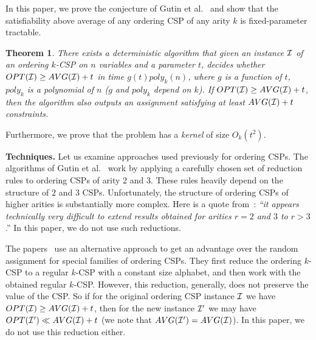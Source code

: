 \documentclass[11pt]{article}
\newcommand {\calI}    {{\cal I}}
\newtheorem{theorem}{Theorem}
\begin{document}
In this paper, we prove the conjecture of Gutin et al.~\cite{GIMY} and show that the satisfiability above average of any ordering CSP of any arity $k$ is fixed-parameter tractable.
\begin{theorem}\label{thm:main-intro}
There exists a deterministic algorithm that given an instance $\calI$ of an ordering $k$-CSP on $n$ variables and a parameter $t$, decides whether
$OPT(\calI) \geq AVG(\calI) + t$ in time $g(t)poly_k(n)$, where $g$ is a function of $t$, $poly_k$ is a polynomial of $n$ ($g$ and $poly_k$ depend on $k$).
If $OPT(\calI) \geq AVG(\calI) + t$, then the algorithm also outputs an assignment satisfying at least $AVG(\calI) + t$ constraints.
\end{theorem}
Furthermore, we prove that the problem has a \emph{kernel} of size $O_k(t^2)$.


\medskip

\noindent \textbf{Techniques.} Let us examine approaches used previously for ordering CSPs.
The algorithms of Gutin et al.~\cite{GKSY, GIMY, GKMY} work by applying a carefully chosen
set of reduction rules to ordering CSPs of arity 2 and 3. These rules heavily depend on the structure of
$2$ and $3$ CSPs. Unfortunately, the structure of ordering
CSPs of higher arities is substantially more complex. Here is a quote from~\cite{GIMY}: \emph{``it appears technically
very difficult to extend results obtained for arities $r = 2$ and $3$ to $r > 3$}.''
In this paper, we do not use such reductions.

The papers~\cite{CMM, GZ, Mak} use an alternative approach to get an advantage over the random assignment
for special families of ordering CSPs. They first reduce the ordering $k$-CSP to a regular $k$-CSP with a constant size alphabet, and
then work with the obtained regular $k$-CSP. However, this reduction, generally, does not preserve the value of the CSP. So if for the original
ordering CSP instance $\calI$ we have $OPT({\cal I})\geq AVG({\cal I})+t$, then for the new instance $\calI'$ we may
have $OPT(\calI') \ll AVG(\calI)+t$ (we note that $AVG(\calI') = AVG(\cal I)$).
In this paper, we do not use this reduction either.
\end{document}
